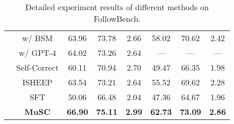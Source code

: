 \begin{table*}[ht]
{\begin{tabular}{cc|ccc|ccc}
                                   & w/ BSM                           & 63.96            & 73.78            & 2.66           & 58.02          & 70.62          & 2.42          \\
                                   & w/ GPT-4                         & 64.02            & 73.26            & 2.64           & —              & —              & —             \\ \cline{2-8} 
                                   & Self-Correct                     & 60.11            & 70.94            & 2.70           & 49.47          & 66.35          & 1.98          \\
                                   & ISHEEP                           & 63.54            & 73.21            & 2.64           & 55.52          & 69.62          & 2.28          \\
                                   & SFT                              & 50.06            & 66.48            & 2.04           & 47.36          & 64.67          & 1.96          \\ \cline{2-8} 
                                   & \textbf{MuSC}                    & \textbf{66.90}   & \textbf{75.11}   & \textbf{2.99}  & \textbf{62.73} & \textbf{73.09} & \textbf{2.86} \\ \hline
\end{tabular}}
\caption{Detailed experiment results of different methods on FollowBench.}
\label{tab:followbench}
\end{table*}

